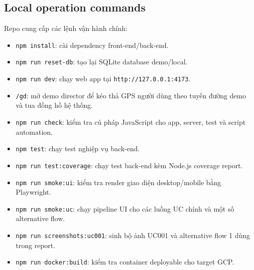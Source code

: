 \subsection{Local operation commands}
Repo cung cấp các lệnh vận hành chính:
\begin{itemize}
  \item \texttt{npm install}: cài dependency front-end/back-end.
  \item \texttt{npm run reset-db}: tạo lại SQLite database demo/local.
  \item \texttt{npm run dev}: chạy web app tại \texttt{http://127.0.0.1:4173}.
  \item \texttt{/gd}: mở demo director để kéo thả GPS người dùng theo tuyến đường demo và tua đồng hồ hệ thống.
  \item \texttt{npm run check}: kiểm tra cú pháp JavaScript cho app, server, test và script automation.
  \item \texttt{npm test}: chạy test nghiệp vụ back-end.
  \item \texttt{npm run test:coverage}: chạy test back-end kèm Node.js coverage report.
  \item \texttt{npm run smoke:ui}: kiểm tra render giao diện desktop/mobile bằng Playwright.
  \item \texttt{npm run smoke:uc}: chạy pipeline UI cho các luồng UC chính và một số alternative flow.
  \item \texttt{npm run screenshots:uc001}: sinh bộ ảnh UC001 và alternative flow 1 dùng trong report.
  \item \texttt{npm run docker:build}: kiểm tra container deployable cho target GCP.
\end{itemize}

